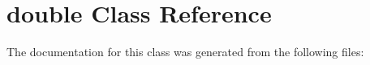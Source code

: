\hypertarget{classdouble}{}\section{double Class Reference}
\label{classdouble}


The documentation for this class was generated from the following files\+: